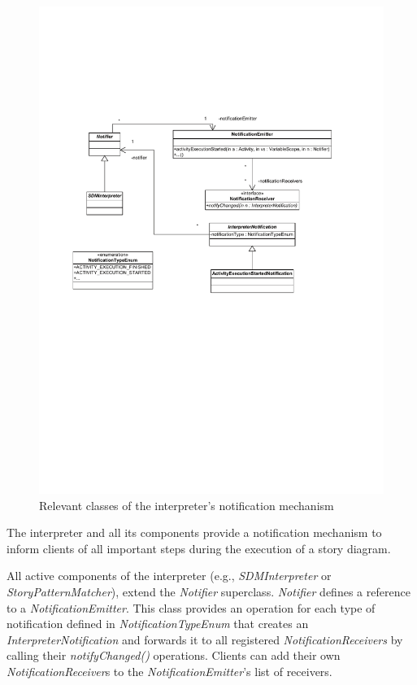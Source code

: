 \begin{figure}
\includegraphics[width=1.0\columnwidth]{figures/interpreter_metamodel_facades.pdf} 
\caption{Relevant classes of the interpreter's notification mechanism}
\end{figure}

The interpreter and all its components provide a notification mechanism to inform clients of all important steps during the execution of a story diagram.

All active components of the interpreter (e.g., \emph{SDMInterpreter} or \emph{StoryPatternMatcher}), extend the \emph{Notifier} superclass. \emph{Notifier} defines a reference to a \emph{NotificationEmitter}. This class provides an operation for each type of notification defined in \emph{NotificationTypeEnum} that creates an \emph{InterpreterNotification} and forwards it to all registered \emph{NotificationReceivers} by calling their \emph{notifyChanged()} operations. Clients can add their own \emph{NotificationReceiver}s to the \emph{NotificationEmitter}'s list of receivers.

